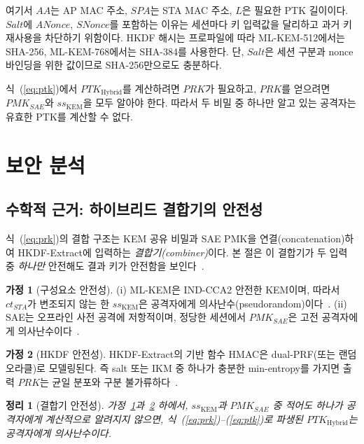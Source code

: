 \documentclass[11pt]{article}
\newcommand{\ctSTA}{\ensuremath{ct_{STA}}}
\newcommand{\ssK}{\ensuremath{ss_{\mathrm{KEM}}}}
\newcommand{\pmkSAE}{\ensuremath{PMK_{SAE}}}
\newcommand{\ptkH}{\ensuremath{PTK_{\mathrm{Hybrid}}}}
\newcommand{\ANonce}{\ensuremath{ANonce}}
\newcommand{\SNonce}{\ensuremath{SNonce}}
\theoremstyle{definition}
\newtheorem{assumption}{가정}
\theoremstyle{plain}
\newtheorem{theorem}{정리}
\begin{document}
여기서 $AA$는 AP MAC 주소, $SPA$는 STA MAC 주소, $L$은 필요한 PTK 길이이다.
$Salt$에 \ANonce{}, \SNonce{}를 포함하는 이유는 세션마다 키 입력값을 달리하고
과거 키 재사용을 차단하기 위함이다. HKDF 해시는 프로파일에 따라 ML-KEM-512에서는
SHA-256, ML-KEM-768에서는 SHA-384를 사용한다. 단, $Salt$은 세션 구분과 nonce
바인딩을 위한 값이므로 SHA-256만으로도 충분하다.

식~(\ref{eq:ptk})에서 \ptkH{}를 계산하려면 $PRK$가 필요하고, $PRK$를 얻으려면
\pmkSAE{}와 \ssK{}을 모두 알아야 한다. 따라서 두 비밀 중 하나만 알고 있는
공격자는 유효한 PTK를 계산할 수 없다.

\section{보안 분석}\label{sec:security}
\subsection{수학적 근거: 하이브리드 결합기의 안전성}\label{sec:proof}
식~(\ref{eq:prk})의 결합 구조는 KEM 공유 비밀과 SAE PMK을 연결(concatenation)하여
HKDF-Extract에 입력하는 \emph{결합기(combiner)}이다. 본 절은 이 결합기가 두
입력 중 \emph{하나만} 안전해도 결과 키가 안전함을 보인다~\cite{giacon,bindel}.

\begin{assumption}[구성요소 안전성]\label{as:comp}
(i) ML-KEM은 IND-CCA2 안전한 KEM이며, 따라서 \ctSTA{}가 변조되지 않는 한 \ssK{}은
공격자에게 의사난수(pseudorandom)이다~\cite{fips203}. (ii) SAE는 오프라인 사전
공격에 저항적이며, 정당한 세션에서 \pmkSAE{}은 고전 공격자에게 의사난수이다~\cite{rfc7664}.
\end{assumption}

\begin{assumption}[HKDF 안전성]\label{as:hkdf}
HKDF-Extract의 기반 함수 HMAC은 dual-PRF(또는 랜덤 오라클)로 모델링된다.
즉 salt 또는 IKM 중 하나가 충분한 min-entropy를 가지면 출력 $PRK$는 균일
분포와 구분 불가류하다~\cite{rfc5869,sp80056c}.
\end{assumption}

\begin{theorem}[결합기 안전성]\label{thm:combiner}
가정~\ref{as:comp}과~\ref{as:hkdf} 하에서, \ssK{}과 \pmkSAE{} 중 적어도 하나가
공격자에게 계산적으로 알려지지 않으면, 식~(\ref{eq:prk})--(\ref{eq:ptk})로
파생된 \ptkH{}는 공격자에게 의사난수이다.
\end{theorem}
\end{document}
